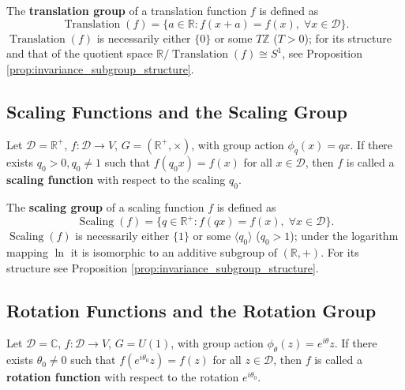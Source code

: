 \begin{definition}\label{def:translation_group_gf}
The \textbf{translation group} of a translation function $f$ is defined as
\[
\operatorname{Translation}(f) = \{a \in \mathbb{R} : f(x + a) = f(x),\; \forall x \in \mathcal{D}\}.
\]
$\operatorname{Translation}(f)$ is necessarily either $\{0\}$ or some $T\mathbb{Z}$ ($T>0$); for its structure and that of the quotient space $\mathbb{R}/\operatorname{Translation}(f)\cong S^1$, see Proposition \ref{prop:invariance_subgroup_structure}.
\end{definition}

\subsection{\texorpdfstring{Scaling Functions and the Scaling Group}{Scaling Functions and the Scaling Group}}

\begin{definition}\label{def:scaling_function_gf}
Let $\mathcal{D} = \mathbb{R}^+$, $f: \mathcal{D} \to V$, $G = (\mathbb{R}^+, \times)$, with group action $\phi_q(x) = qx$. If there exists $q_0 > 0, q_0 \neq 1$ such that $f(q_0 x) = f(x)$ for all $x \in \mathcal{D}$, then $f$ is called a \textbf{scaling function} with respect to the scaling $q_0$.
\end{definition}

\begin{definition}\label{def:scaling_group_gf}
The \textbf{scaling group} of a scaling function $f$ is defined as
\[
\operatorname{Scaling}(f) = \{q \in \mathbb{R}^+ : f(qx) = f(x),\; \forall x \in \mathcal{D}\}.
\]
$\operatorname{Scaling}(f)$ is necessarily either $\{1\}$ or some $\langle q_0\rangle$ ($q_0>1$); under the logarithm mapping $\ln$ it is isomorphic to an additive subgroup of $(\mathbb{R},+)$. For its structure see Proposition \ref{prop:invariance_subgroup_structure}.
\end{definition}

\subsection{\texorpdfstring{Rotation Functions and the Rotation Group}{Rotation Functions and the Rotation Group}}

\begin{definition}\label{def:rotation_function_gf}
Let $\mathcal{D} = \mathbb{C}$, $f: \mathcal{D} \to V$, $G = U(1)$, with group action $\phi_\theta(z) = e^{i\theta}z$. If there exists $\theta_0 \neq 0$ such that $f(e^{i\theta_0} z) = f(z)$ for all $z \in \mathcal{D}$, then $f$ is called a \textbf{rotation function} with respect to the rotation $e^{i\theta_0}$.
\end{definition}

